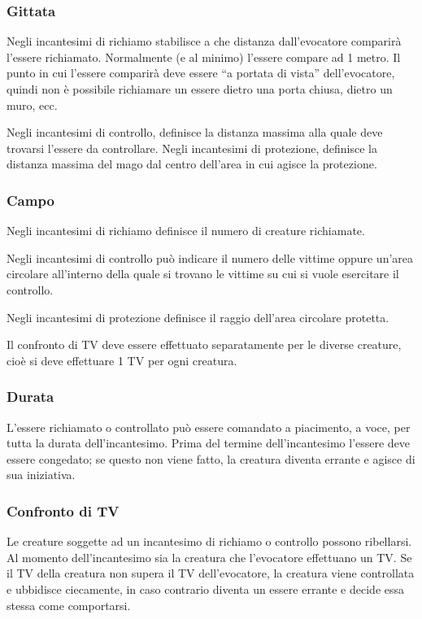 \subsubsection{Gittata}  

Negli incantesimi di richiamo stabilisce a che
distanza dall'evocatore comparir\`a l'essere richiamato. Normalmente
(e al minimo) l'essere compare ad 1 metro.  Il punto in cui l'essere
comparir\`a deve essere ``a portata di vista''
dell'evocatore, quindi non \`e possibile richiamare un essere dietro
una porta chiusa, dietro un muro, ecc. 

Negli incantesimi di controllo,
definisce la distanza massima alla quale deve trovarsi l'essere da
controllare. Negli incantesimi di protezione, definisce la distanza
massima del mago dal centro dell'area in cui agisce la protezione.

\subsubsection{Campo} 

Negli incantesimi di richiamo definisce il numero di creature
richiamate.

Negli incantesimi di controllo pu\`o indicare il numero delle vittime
oppure un'area circolare all'interno della quale si trovano le vittime
su cui si vuole esercitare il controllo.

Negli incantesimi di protezione definisce il raggio dell'area
circolare protetta.

Il confronto di TV deve essere effettuato separatamente per le diverse
creature, cio\`e si deve effettuare 1 TV per ogni creatura. 

\subsubsection{Durata}  

L'essere richiamato o controllato pu\`o essere comandato a
piacimento, a voce, per tutta la durata dell'incantesimo. Prima del
termine dell'incantesimo l'essere deve essere congedato; se questo non
viene fatto, la creatura diventa errante e agisce di sua iniziativa.

\subsubsection{Confronto di TV} 

Le creature soggette ad un incantesimo di
richiamo o controllo possono ribellarsi. Al momento dell'incantesimo
sia la creatura che l'evocatore effettuano un TV. Se il TV della
creatura non supera il TV dell'evocatore, la creatura viene
controllata e ubbidisce ciecamente, in caso contrario diventa un
essere errante e decide essa stessa come comportarsi.  

